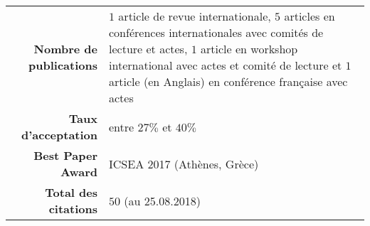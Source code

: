 
\begin{tabular}{r @{~$\rangle$~} p{}}

\textbf{Nombre de publications} & $1$ article de revue internationale, $5$ articles en conférences internationales avec comités de lecture et actes, $1$ article en workshop international avec actes et comité de lecture et $1$ article (en Anglais) en conférence française avec actes\\
\textbf{Taux d'acceptation} & entre $27\%$ et $40\%$\\
\textbf{Best Paper Award} & ICSEA 2017 (Athènes, Grèce)\\
\textbf{Total des citations} & $50$ (au 25.08.2018)\\
\end{tabular}


